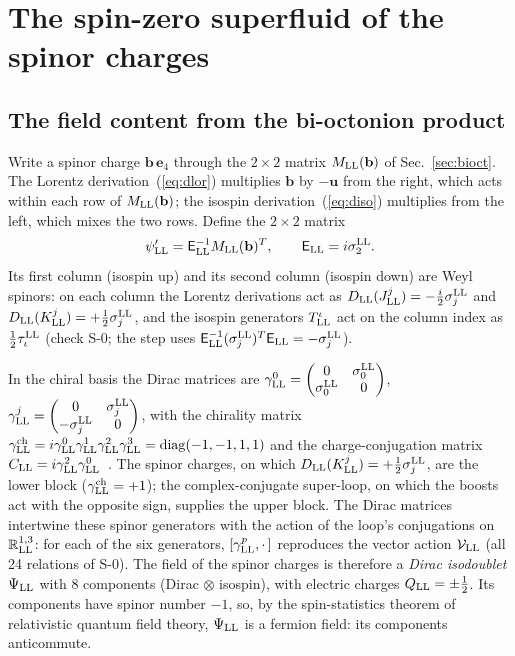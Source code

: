 \section{The spin-zero superfluid of the spinor charges}
\label{sec:superfluid}

\subsection{The field content from the bi-octonion product}

Write a spinor charge $\mathbf b\,\mathbf e_4$ through the $2\times2$ matrix $M_{\rm LL}(\mathbf b)$ of
Sec.~\ref{sec:bioct}. The Lorentz derivation~(\ref{eq:dlor}) multiplies $\mathbf b$ by $-\mathbf u$ from
the right, which acts within each row of $M_{\rm LL}(\mathbf b)$; the isospin derivation~(\ref{eq:diso})
multiplies from the left, which mixes the two rows. Define the $2\times2$ matrix
\begin{equation}
\psi'_{\rm LL}=\mathsf E_{\rm LL}^{-1}M_{\rm LL}(\mathbf b)^T,\qquad \mathsf E_{\rm LL}=i\sigma^{\rm LL}_2 .
\label{eq:psiprime}
\end{equation}
Its first column (isospin up) and its second column (isospin down) are Weyl spinors: on each column the
Lorentz derivations act as $D_{\rm LL}(J^j_{\rm LL})=-\tfrac{i}{2}\sigma^{\rm LL}_j$ and $D_{\rm
LL}(K^j_{\rm LL})=+\tfrac12\sigma^{\rm LL}_j$, and the isospin generators $T^\iota_{\rm LL}$ act on the
column index as $\tfrac12\tau^{\rm LL}_\iota$ (check S-0; the step uses $\mathsf E_{\rm
LL}^{-1}(\sigma^{\rm LL}_j)^T\mathsf E_{\rm LL}=-\sigma^{\rm LL}_j$).

In the chiral basis the Dirac matrices are $\gamma^0_{\rm LL}=\begin{pmatrix}0&\sigma^{\rm
LL}_0\\\sigma^{\rm LL}_0&0\end{pmatrix}$, $\gamma^j_{\rm LL}=\begin{pmatrix}0&\sigma^{\rm
LL}_j\\-\sigma^{\rm LL}_j&0\end{pmatrix}$, with the chirality matrix $\gamma^{\rm ch}_{\rm LL}=i\gamma^0_{\rm
LL}\gamma^1_{\rm LL}\gamma^2_{\rm LL}\gamma^3_{\rm LL}=\mathrm{diag}(-1,-1,1,1)$ and the charge-conjugation
matrix $C_{\rm LL}=i\gamma^2_{\rm LL}\gamma^0_{\rm LL}$~\cite{PeskinSchroeder1995}. The spinor charges, on
which $D_{\rm LL}(K^j_{\rm LL})=+\tfrac12\sigma^{\rm LL}_j$, are the lower block ($\gamma^{\rm ch}_{\rm
LL}=+1$); the complex-conjugate super-loop, on which the boosts act with the opposite sign, supplies the
upper block. The Dirac matrices intertwine these spinor generators with the action of the loop's
conjugations on $\mathbb R^{1,3}_{\rm LL}$: for each of the six generators, $[\gamma^p_{\rm LL},\cdot\,]$
reproduces the vector action $\mathcal V_{\rm LL}$ (all 24 relations of S-0). The field of the
spinor charges is therefore a \emph{Dirac isodoublet} $\Psi_{\rm LL}$ with 8 components (Dirac $\otimes$
isospin), with electric charges $Q_{\rm LL}=\pm\tfrac12$. Its components have spinor number $-1$, so, by
the spin-statistics theorem of relativistic quantum field theory, $\Psi_{\rm LL}$ is a fermion field: its
components anticommute.

